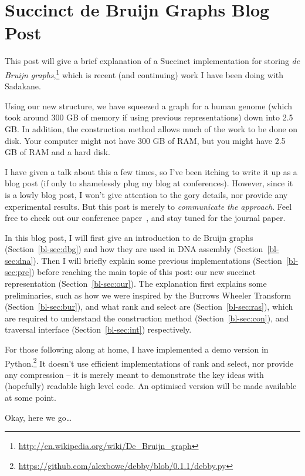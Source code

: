 \chapter{Succinct de Bruijn Graphs Blog Post}

This post will give a brief explanation of a Succinct implementation for storing \emph{de Bruijn graphs},\footnote{\url{http://en.wikipedia.org/wiki/De_Bruijn_graph}} which is recent (and continuing) work I have been doing with Sadakane.

Using our new structure, we have squeezed a graph for a human genome (which took around 300 GB of memory if using previous representations) down into 2.5 GB. In addition, the construction method allows much of the work to be done on disk. Your computer might not have 300 GB of RAM, but you might have 2.5 GB of RAM and a hard disk.

I have given a talk about this a few times, so I've been itching to write it up as a blog post (if only to shamelessly plug my blog at conferences). However, since it is a lowly blog post, I won't give attention to the gory details, nor provide any experimental results. But this post is merely to \emph{communicate the approach}. Feel free to check out our conference paper~\cite{BOSS12}, and stay tuned for the journal paper.

In this blog post, I will first give an introduction to de Bruijn graphs (Section~\ref{bl-sec:dbg}) and how they are used in DNA assembly (Section~\ref{bl-sec:dna}). Then I will briefly explain some previous implementations (Section~\ref{bl-sec:pre}) before reaching the main topic of this post: our new succinct representation (Section~\ref{bl-sec:our}). The explanation first explains some preliminaries, such as how we were inspired by the Burrows Wheeler Transform (Section~\ref{bl-sec:bur}), and what rank and select are (Section~\ref{bl-sec:ras}), which are required to understand the construction method (Section~\ref{bl-sec:con}), and traversal interface (Section~\ref{bl-sec:int}) respectively.

For those following along at home, I have implemented a demo version in Python.\footnote{\url{https://github.com/alexbowe/debby/blob/0.1.1/debby.py}} It doesn't use efficient implementations of rank and select, nor provide any compression -- it is merely meant to demonstrate the key ideas with (hopefully) readable high level code. An optimised version will be made available at some point.

Okay, here we go\ldots

